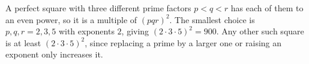 A perfect square with three different prime factors $p<q<r$ has each of them to an even power, so it is a multiple of $(pqr)^2$. The smallest choice is $p,q,r=2,3,5$ with exponents $2$, giving $(2\cdot3\cdot5)^2=\boxed{900}$. Any other such square is at least $(2\cdot3\cdot5)^2$, since replacing a prime by a larger one or raising an exponent only increases it.
